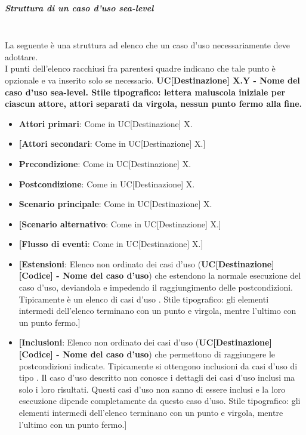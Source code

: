 \subparagraph*{Struttura di un caso d'uso sea-level}\mbox{}\\
La seguente è una struttura ad elenco che un caso d'uso  necessariamente deve adottare.\\
I punti dell'elenco racchiusi fra parentesi quadre indicano che tale punto è opzionale e va inserito solo se necessario.
\textbf{UC[Destinazione] X.Y - Nome del caso d'uso sea-level. Stile tipografico: lettera maiuscola iniziale per ciascun attore, attori separati da virgola, nessun punto fermo alla fine.}%
\begin{itemize}
	\item \textbf{Attori primari}: Come in UC[Destinazione] X.
	\item \textbf{[Attori secondari}: Come in UC[Destinazione] X.]
	\item \textbf{Precondizione}: Come in UC[Destinazione] X.
	\item \textbf{Postcondizione}: Come in UC[Destinazione] X.
	\item \textbf{Scenario principale}: Come in UC[Destinazione] X.
	\item \textbf{[Scenario alternativo}: Come in UC[Destinazione] X.]
	\item \textbf{[Flusso di eventi}: Come in UC[Destinazione] X.]
	\item \textbf{[Estensioni}: Elenco non ordinato dei casi d'uso (\textbf{UC[Destinazione] [Codice] - Nome del caso d'uso}) che estendono la normale esecuzione del caso d'uso, deviandola e impedendo il raggiungimento delle postcondizioni.
	Tipicamente è un elenco di casi d'uso .
	Stile tipografico: gli elementi intermedi dell'elenco terminano con un punto e virgola, mentre l'ultimo con un punto fermo.]
	\item \textbf{[Inclusioni}: Elenco non ordinato dei casi d'uso (\textbf{UC[Destinazione] [Codice] - Nome del caso d'uso}) che permettono di raggiungere le postcondizioni indicate.
	Tipicamente si ottengono inclusioni da casi d'uso di tipo .
	Il caso d'uso descritto non conosce i dettagli dei casi d'uso inclusi ma solo i loro risultati.
	Questi casi d'uso non sanno di essere inclusi e la loro esecuzione dipende completamente da questo caso d'uso.
	Stile tipografico: gli elementi intermedi dell'elenco terminano con un punto e virgola, mentre l'ultimo con un punto fermo.]
\end{itemize}

